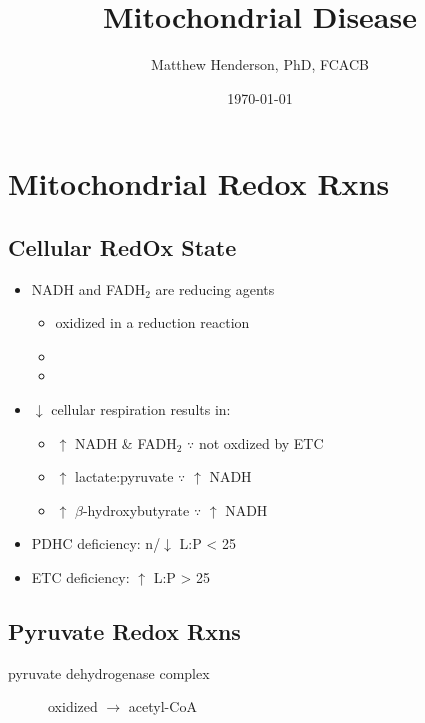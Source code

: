 \documentclass{scrartcl}
\author{Matthew Henderson, PhD, FCACB}
\date{\today}
\title{Mitochondrial Disease}
\begin{document}
\maketitle
\tableofcontents


\section{Mitochondrial Redox Rxns}
\label{sec:org3833df8}
\subsection{Cellular RedOx State}
\label{sec:orgb504712}
\begin{itemize}
\item NADH and FADH\(_{\text{2}}\) are reducing agents
\begin{itemize}
\item oxidized in a reduction reaction
\item {}
\item {}
\end{itemize}
\item \(\downarrow\) cellular respiration results in:
\begin{itemize}
\item \(\uparrow\) NADH \& FADH\(_{\text{2}}\) \(\because\) not oxdized by ETC
\item \(\uparrow\) lactate:pyruvate \(\because\) \(\uparrow\) NADH
\item \(\uparrow\) \(\beta\)-hydroxybutyrate  \(\because\) \(\uparrow\) NADH
\end{itemize}

\item PDHC deficiency: n/\(\downarrow\) L:P < 25
\item ETC deficiency: \(\uparrow\) L:P > 25
\end{itemize}

\subsection{Pyruvate Redox Rxns}
\label{sec:org0e85f77}
\begin{description}
\item[{pyruvate dehydrogenase complex}] oxidized \(\to\) acetyl-CoA
\end{description}

\end{document}
